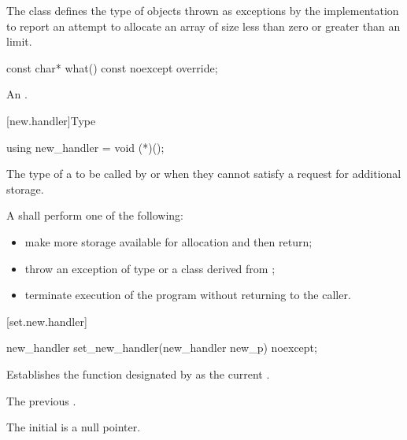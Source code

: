 \pnum
The class  defines the type of objects thrown as
exceptions by the implementation to report an attempt to allocate an array of size
less than zero or
greater than an  limit.

%
\begin{itemdecl}
const char* what() const noexcept override;
\end{itemdecl}

\begin{itemdescr}
\pnum
\returns
An  \ntbs{}.
\end{itemdescr}

[new.handler]{Type }

\begin{indexed}{}
\begin{itemdecl}
using new_handler = void (*)();
\end{itemdecl}
\end{indexed}

\begin{itemdescr}
\pnum
The type of a
to be called by
or
 when they cannot satisfy a request for additional storage.

\pnum
\required
A  shall perform one of the following:
\begin{itemize}
\item
make more storage available for allocation and then return;
\item
throw an exception of type
or a class derived from
%
;
\item
terminate execution of the program without returning to the caller.
%
%
\end{itemize}
\end{itemdescr}

[set.new.handler]{}

%
\begin{itemdecl}
new_handler set_new_handler(new_handler new_p) noexcept;
\end{itemdecl}

\begin{itemdescr}
\pnum
\effects
Establishes the function designated by  as the current
.

\pnum
\returns
The previous .

\pnum
\remarks
The initial  is a null pointer.
\end{itemdescr}


